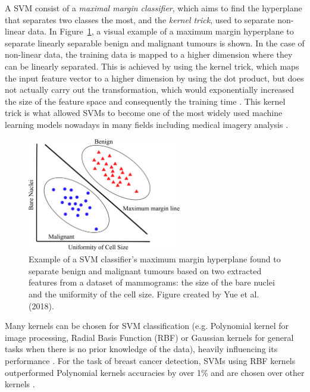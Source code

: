 A SVM consist of a \textit{maximal margin classifier}, which aims to find the hyperplane that separates two classes the most, and the \textit{kernel trick}, used to separate non-linear data. In Figure~\ref{fig:litsurvey-svm-example}, a visual example of a maximum margin hyperplane to separate linearly separable benign and malignant tumours is shown. In the case of non-linear data, the training data is mapped to a higher dimension where they can be linearly separated. This is achieved by using the kernel trick, which maps the input feature vector to a higher dimension by using the dot product, but does not actually carry out the transformation, which would exponentially increased the size of the feature space and consequently the training time \cite{Geron2019}. This kernel trick is what allowed SVMs to become one of the most widely used machine learning models nowadays in many fields including medical imagery analysis \cite{Yue2018}.\\

\begin{figure}[ht]
\centerline{\includegraphics[width=0.6\textwidth]{Dissertation/figures/litsurvey/svm.png}}
\caption{\label{fig:litsurvey-svm-example}Example of a SVM classifier's maximum margin hyperplane found to separate benign and malignant tumours based on two extracted features from a dataset of mammograms: the size of the bare nuclei and the uniformity of the cell size. Figure created by Yue et al. (2018).}
\end{figure}

Many kernels can be chosen for SVM classification (e.g. Polynomial kernel for image processing, Radial Basis Function (RBF) or Gaussian kernels for general tasks when there is no prior knowledge of the data), heavily influencing its performance \cite{amari1999improving}. For the task of breast cancer detection, SVMs using RBF kernels outperformed Polynomial kernels accuracies by over 1\% \cite{Osareh2010} and are chosen over other kernels \cite{Asri2016}.

